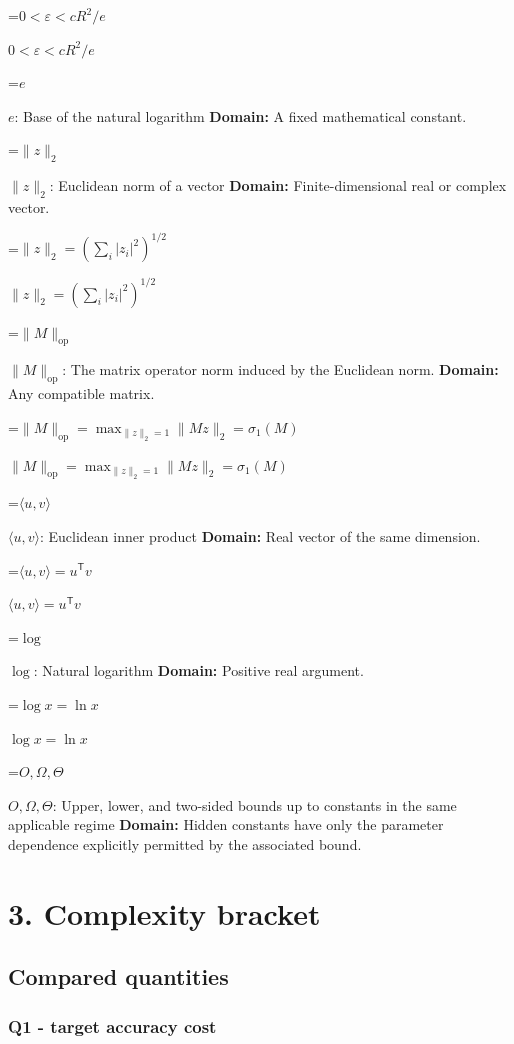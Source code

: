 \documentclass[10pt,a4paper]{article}
\newcommand{\AtlasMath}[1]{\par\begingroup\centering\setbox0=\hbox{$\displaystyle #1$}\ifdim\wd0>1.4\linewidth\typeout{ATLAS WIDE FORMULA: \the\wd0}\fi\ifdim\wd0>\linewidth\resizebox{\linewidth}{!}{\box0}\else\box0\fi\par\endgroup}
\newcommand{\AtlasInlineMath}[1]{\begingroup\setbox0=\hbox{$#1$}\ifdim\wd0>.4\linewidth\endgroup\AtlasMath{#1}\else\endgroup$#1$\fi}
\begin{document}
\AtlasInlineMath{0<\varepsilon<cR^2/e}



\AtlasInlineMath{e}: Base of the natural logarithm \textbf{Domain:} A fixed mathematical constant.



\AtlasInlineMath{\|z\|_2}: Euclidean norm of a vector \textbf{Domain:} Finite-dimensional real or complex vector.



\AtlasInlineMath{\|z\|_2=(\sum_i|z_i|^2)^{1/2}}



\AtlasInlineMath{\|M\|_{\mathrm{op}}}: The matrix operator norm induced by the Euclidean norm. \textbf{Domain:} Any compatible matrix.



\AtlasInlineMath{\|M\|_{\mathrm{op}}=\max_{\|z\|_2=1}\|Mz\|_2=\sigma_1(M)}



\AtlasInlineMath{\langle u,v\rangle}: Euclidean inner product \textbf{Domain:} Real vector of the same dimension.



\AtlasInlineMath{\langle u,v\rangle=u^{\mathsf T}v}



\AtlasInlineMath{\log}: Natural logarithm \textbf{Domain:} Positive real argument.



\AtlasInlineMath{\log x=\ln x}



\AtlasInlineMath{O,\Omega,\Theta}: Upper, lower, and two-sided bounds up to constants in the same applicable regime \textbf{Domain:} Hidden constants have only the parameter dependence explicitly permitted by the associated bound.



\section{3. Complexity bracket}


\subsection{Compared quantities}


\subsubsection{Q1 - target accuracy cost}
\end{document}
